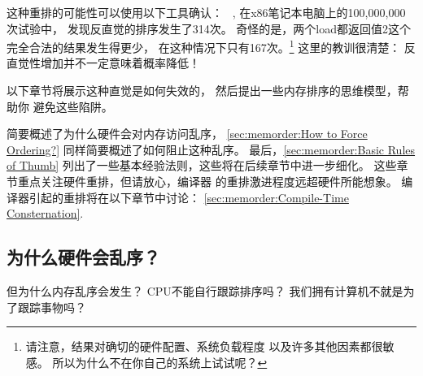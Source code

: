 \begin{listing}

\caption{内存乱序：
			     Store-Buffering Litmus Test}
\label{lst:memorder:Memory Misordering: Store-Buffering Litmus Test}
\end{listing}

\QuickQuizEnd

这种重排的可能性可以使用以下工具确认：
~\cite{Alglave:2014:HCM:2594291.2594347},
在x86笔记本电脑上的100,000,000次试验中，
发现反直觉的排序发生了314次。
奇怪的是，两个load都返回值2这个完全合法的结果发生得更少，
在这种情况下只有167次。\footnote{
	请注意，结果对确切的硬件配置、系统负载程度
	以及许多其他因素都很敏感。
	所以为什么不在你自己的系统上试试呢？}
这里的教训很清楚：
反直觉性增加并不一定意味着概率降低！

以下章节将展示这种直觉是如何失效的，
然后提出一些内存排序的思维模型，帮助你
避免这些陷阱。

简要概述了为什么硬件会对内存访问乱序，
\cref{sec:memorder:How to Force Ordering?}
同样简要概述了如何阻止这种乱序。
最后，\cref{sec:memorder:Basic Rules of Thumb}
列出了一些基本经验法则，这些将在后续章节中进一步细化。
这些章节重点关注硬件重排，但请放心，编译器
的重排激进程度远超硬件所能想象。
编译器引起的重排将在以下章节中讨论：
\cref{sec:memorder:Compile-Time Consternation}.

\subsection{为什么硬件会乱序？}
\label{sec:memorder:Why Hardware Misordering?}

但为什么内存乱序会发生？
CPU不能自行跟踪排序吗？
我们拥有计算机不就是为了跟踪事物吗？

